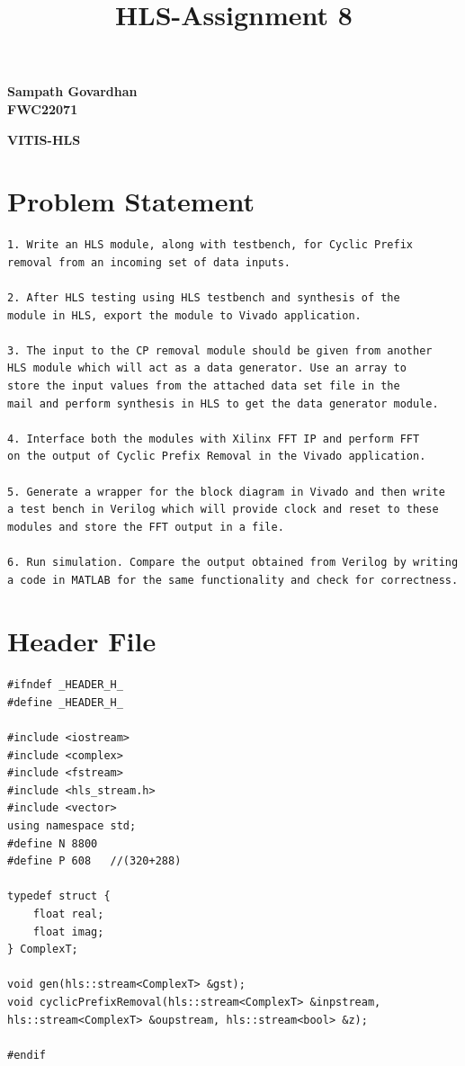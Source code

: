 \documentclass{article}
\title{
HLS-Assignment 8
}
\begin{document}
\maketitle
\hfill \textbf{Sampath Govardhan} \\
\null \hfill \textbf{FWC22071}\\
\maketitle
\hfill \textbf{VITIS-HLS}
\section{Problem Statement}
\begin{lstlisting}
1. Write an HLS module, along with testbench, for Cyclic Prefix 
removal from an incoming set of data inputs.

2. After HLS testing using HLS testbench and synthesis of the 
module in HLS, export the module to Vivado application.

3. The input to the CP removal module should be given from another 
HLS module which will act as a data generator. Use an array to
store the input values from the attached data set file in the 
mail and perform synthesis in HLS to get the data generator module.

4. Interface both the modules with Xilinx FFT IP and perform FFT
on the output of Cyclic Prefix Removal in the Vivado application.

5. Generate a wrapper for the block diagram in Vivado and then write 
a test bench in Verilog which will provide clock and reset to these 
modules and store the FFT output in a file.

6. Run simulation. Compare the output obtained from Verilog by writing 
a code in MATLAB for the same functionality and check for correctness.

\end{lstlisting}
\vspace{6cm}
\section{Header File}
\begin{lstlisting}
#ifndef _HEADER_H_
#define _HEADER_H_

#include <iostream>
#include <complex>
#include <fstream>
#include <hls_stream.h>
#include <vector>
using namespace std;
#define N 8800
#define P 608   //(320+288)

typedef struct {
    float real;
    float imag;
} ComplexT;

void gen(hls::stream<ComplexT> &gst);
void cyclicPrefixRemoval(hls::stream<ComplexT> &inpstream, hls::stream<ComplexT> &oupstream, hls::stream<bool> &z);

#endif


\end{lstlisting}
\vspace{6cm}
\end{document}
